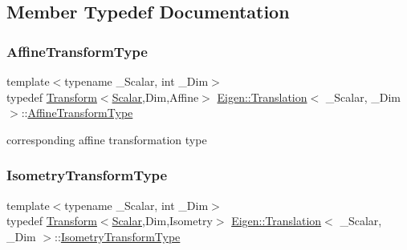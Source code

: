 \subsection{Member Typedef Documentation}
\mbox{\label{class_eigen_1_1_translation_a25c762409320ba9490a0d12c6652bbad}} 
\subsubsection{\texorpdfstring{AffineTransformType}{AffineTransformType}}
{\footnotesize\ttfamily template$<$typename \+\_\+\+Scalar, int \+\_\+\+Dim$>$ \\
typedef \mbox{\hyperlink{class_eigen_1_1_transform}{Transform}}$<$\mbox{\hyperlink{class_eigen_1_1_translation_ad596bf21ced4b902cc242205df486e21}{Scalar}},Dim,Affine$>$ \mbox{\hyperlink{class_eigen_1_1_translation}{Eigen\+::\+Translation}}$<$ \+\_\+\+Scalar, \+\_\+\+Dim $>$\+::\mbox{\hyperlink{class_eigen_1_1_translation_a25c762409320ba9490a0d12c6652bbad}{Affine\+Transform\+Type}}}

corresponding affine transformation type \mbox{\label{class_eigen_1_1_translation_ad3ac890d85420ba78e16dab1983d1a80}} 
\subsubsection{\texorpdfstring{IsometryTransformType}{IsometryTransformType}}
{\footnotesize\ttfamily template$<$typename \+\_\+\+Scalar, int \+\_\+\+Dim$>$ \\
typedef \mbox{\hyperlink{class_eigen_1_1_transform}{Transform}}$<$\mbox{\hyperlink{class_eigen_1_1_translation_ad596bf21ced4b902cc242205df486e21}{Scalar}},Dim,Isometry$>$ \mbox{\hyperlink{class_eigen_1_1_translation}{Eigen\+::\+Translation}}$<$ \+\_\+\+Scalar, \+\_\+\+Dim $>$\+::\mbox{\hyperlink{class_eigen_1_1_translation_ad3ac890d85420ba78e16dab1983d1a80}{Isometry\+Transform\+Type}}}

